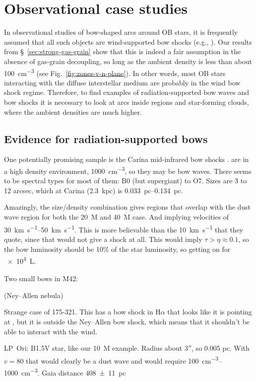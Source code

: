 \section{Observational case studies}
\label{sec:case-studies}

In observational studies of bow-shaped arcs around OB stars, it is
frequently assumed that all such objects are wind-supported bow shocks
(e.g., \citealp{Kobulnicky:2016a}). Our results from
\S~\ref{sec:strong-gas-grain} show that this is indeed a fair
assumption in the absence of gas-grain decoupling, so long as the
ambient density is less than about \SI{100}{cm^{-3}} (see
Fig.~\ref{fig:zones-v-n-plane}). In other words, most OB stars
interacting with the diffuse interstellar medium are probably in the
wind bow shock regime.  Therefore, to find examples of
radiation-supported bow waves and bow shocks it is necessary to look
at arcs inside \hii{} regions and star-forming clouds, where the
ambient densities are much higher.

\subsection{Evidence for radiation-supported bows}

One potentially promising sample is the Carina mid-infrared bow shocks
\citep{Sexton:2015b}.   are in a high density environment,
\SI{1000}{cm^{-3}}, so they may be bow waves.  There seems to be
spectral types for most of them: B0 (but supergiant) to O7.  Sizes are
3 to 12 arcsec, which at Carina (\SI{2.3}{kpc}) is
\SIrange{0.033}{0.134}{pc}.

Amazingly, the size/density combination gives regions that overlap
with the dust wave region for both the \SI{20}{M_\odot} and \SI{40}{M_\odot}
case.  And implying velocities of \SIrange{30}{50}{km.s^{-1}}.  This
is more believable than the \SI{10}{km.s^{-1}} that they quote, since
that would not give a shock at all.  This would imply
\(\tau > \eta \approx 0.1\), so the bow luminosity should be 10\% of the star
luminosity, so getting on for \SI{e4}{L_\odot}.

Two small bows in M42:

\thD{} (Ney--Allen nebula) \citep{Robberto:2005a}

Strange case of 175-321.  This has a bow shock in H\(\alpha\) that looks
like it is pointing at \thD{}, but it is outside the Ney--Allen bow
shock, which means that it shouldn't be able to interact with the wind.

LP~Ori: B1.5V star, like our \SI{10}{M_\odot} example. Radius about
\(3''\), so 0.005 pc.  With \(v = 80\) that would clearly be a dust
wave and would require \SIrange{100}{1000}{cm^{-3}}. Gaia distance \SI{408 +- 11}{pc}


